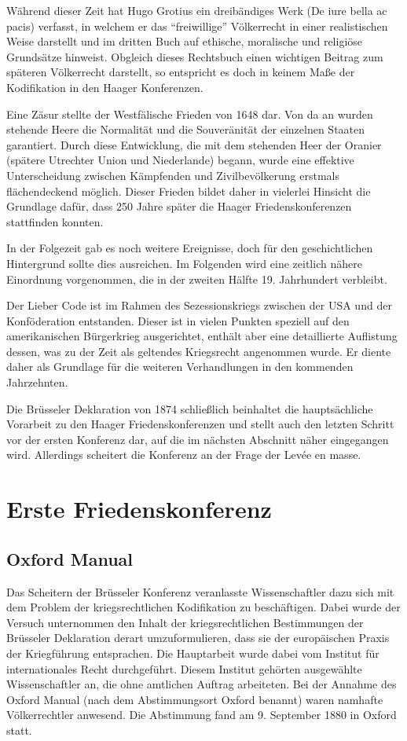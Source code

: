 \documentclass[12pt]{scrartcl}
\begin{document}
Während dieser Zeit hat Hugo Grotius ein dreibändiges Werk (De iure bella ac pacis) verfasst, in welchem er das "`freiwillige"' Völkerrecht in einer realistischen Weise darstellt und im dritten Buch auf ethische, moralische und religiöse Grundsätze hinweist. Obgleich dieses Rechtsbuch einen wichtigen Beitrag zum späteren Völkerrecht darstellt, so entspricht es doch in keinem Maße der Kodifikation in den Haager Konferenzen.

Eine Zäsur stellte der Westfälische Frieden von 1648 dar. Von da an wurden stehende Heere die Normalität und die Souveränität der einzelnen Staaten garantiert. Durch diese Entwicklung, die mit dem stehenden Heer der Oranier (spätere Utrechter Union und Niederlande) begann, wurde eine effektive Unterscheidung zwischen Kämpfenden und Zivilbevölkerung erstmals flächendeckend möglich. Dieser Frieden bildet daher in vielerlei Hinsicht die Grundlage dafür, dass 250 Jahre später die Haager Friedenskonferenzen stattfinden konnten.

In der Folgezeit gab es noch weitere Ereignisse, doch für den geschichtlichen Hintergrund sollte dies ausreichen. Im Folgenden wird eine zeitlich nähere Einordnung vorgenommen, die in der zweiten Hälfte 19. Jahrhundert verbleibt.

Der Lieber Code ist im Rahmen des Sezessionskriegs zwischen der USA und der Konföderation entstanden. Dieser ist in vielen Punkten speziell auf den amerikanischen Bürgerkrieg ausgerichtet, enthält aber eine detaillierte Auflistung dessen, was zu der Zeit als geltendes Kriegsrecht angenommen wurde. Er diente daher als Grundlage für die weiteren Verhandlungen in den kommenden Jahrzehnten.

Die Brüsseler Deklaration von 1874 schließlich beinhaltet die hauptsächliche Vorarbeit zu den Haager Friedenskonferenzen und stellt auch den letzten Schritt vor der ersten Konferenz dar, auf die im nächsten Abschnitt näher eingegangen wird. Allerdings scheitert die Konferenz an der Frage der Levée en masse.

\section{Erste Friedenskonferenz}

\subsection{Oxford Manual}

Das Scheitern der Brüsseler Konferenz veranlasste Wissenschaftler dazu sich mit dem Problem der kriegsrechtlichen Kodifikation zu beschäftigen. Dabei wurde der Versuch unternommen den Inhalt der kriegsrechtlichen Bestimmungen der Brüsseler Deklaration derart umzuformulieren, dass sie der europäischen Praxis der Kriegführung entsprachen. Die Hauptarbeit wurde dabei vom Institut für internationales Recht durchgeführt. Diesem Institut gehörten ausgewählte Wissenschaftler an, die ohne amtlichen Auftrag arbeiteten. Bei der Annahme des Oxford Manual (nach dem Abstimmungsort Oxford benannt) waren namhafte Völkerrechtler anwesend. Die Abstimmung fand am 9. September 1880 in Oxford statt.\cite{Buss1992}
\end{document}
